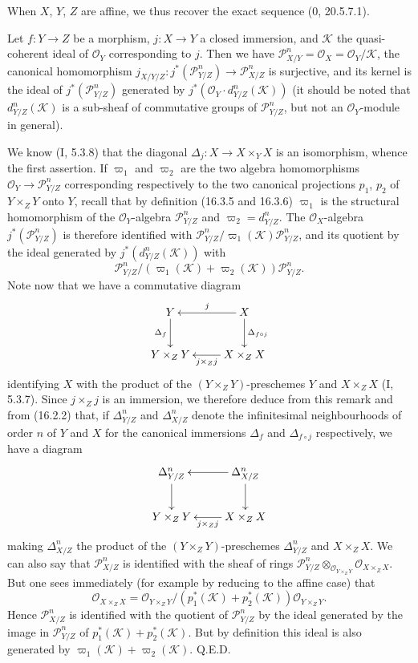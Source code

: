 When $X$, $Y$, $Z$ are affine, we thus recover the exact sequence
(0, 20.5.7.1).

\begin{proposition}[16.4.20]
\label{IV.16.4.20}
Let $f:Y\to Z$ be a morphism, $j:X\to Y$ a closed immersion, and
$\mathscr{K}$ the quasi-coherent ideal of $\mathcal{O}_Y$ corresponding to $j$.
Then we have
$\mathscr{P}_{X/Y}^n=\mathcal{O}_X=\mathcal{O}_Y/\mathscr{K}$,
the canonical homomorphism
$j_{X/Y/Z}:j^*(\mathscr{P}_{Y/Z}^n)\to\mathscr{P}_{X/Z}^n$ is surjective, and
its kernel is the ideal of $j^*(\mathscr{P}_{Y/Z}^n)$ generated by
$j^*(\mathcal{O}_Y\cdot d_{Y/Z}^n(\mathscr{K}))$ (it should be noted that
$d_{Y/Z}^n(\mathscr{K})$ is a sub-sheaf of commutative groups of
$\mathscr{P}_{Y/Z}^n$, but not an $\mathcal{O}_Y$-module in general).
\end{proposition}

We know (I, 5.3.8) that the diagonal
$\Delta_j:X\to X\times_Y X$ is an isomorphism, whence the first assertion.
If $\varpi_1$ and $\varpi_2$ are the two algebra homomorphisms
$\mathcal{O}_Y\to\mathscr{P}_{Y/Z}^n$ corresponding respectively to the two
canonical projections $p_1$, $p_2$ of $Y\times_Z Y$ onto $Y$, recall that
by definition (16.3.5 and 16.3.6) $\varpi_1$ is the structural homomorphism of
the $\mathcal{O}_Y$-algebra $\mathscr{P}_{Y/Z}^n$ and
$\varpi_2=d_{Y/Z}^n$. The $\mathcal{O}_X$-algebra
$j^*(\mathscr{P}_{Y/Z}^n)$ is therefore identified with
$\mathscr{P}_{Y/Z}^n/\varpi_1(\mathscr{K})\mathscr{P}_{Y/Z}^n$, and its quotient
by the ideal generated by $j^*(d_{Y/Z}^n(\mathscr{K}))$ with
\[
  \mathscr{P}_{Y/Z}^n/
  (\varpi_1(\mathscr{K})+\varpi_2(\mathscr{K}))\mathscr{P}_{Y/Z}^n.
\]
Note now that we have a commutative diagram
\[
  \xymatrix{
    Y\ar[d]_-{\Delta_f}&X\ar[l]_-j\ar[d]^-{\Delta_{f\circ j}}\\
    Y\times_Z Y&X\times_Z X\ar[l]^-{j\times_Z j}
  }
\]
identifying $X$ with the product of the $(Y\times_Z Y)$-preschemes $Y$ and
$X\times_Z X$ (I, 5.3.7). Since $j\times_Z j$ is an immersion, we therefore
deduce from this remark and from (16.2.2) that, if $\Delta_{Y/Z}^n$ and
$\Delta_{X/Z}^n$ denote the infinitesimal neighbourhoods of order $n$ of $Y$
and $X$ for the canonical immersions $\Delta_f$ and $\Delta_{f\circ j}$
respectively, we have a diagram
\[
  \xymatrix{
    \Delta_{Y/Z}^n\ar[d]&\Delta_{X/Z}^n\ar[l]\ar[d]\\
    Y\times_Z Y&X\times_Z X\ar[l]^-{j\times_Z j}
  }
\]
making $\Delta_{X/Z}^n$ the product of the $(Y\times_Z Y)$-preschemes
$\Delta_{Y/Z}^n$ and $X\times_Z X$. We can also say that
$\mathscr{P}_{X/Z}^n$ is identified with the sheaf of rings
$\mathscr{P}_{Y/Z}^n\otimes_{\mathcal{O}_{Y\times_Z Y}}
\mathcal{O}_{X\times_Z X}$. But one sees immediately (for example by reducing
to the affine case) that
\[
  \mathcal{O}_{X\times_Z X}=
  \mathcal{O}_{Y\times_Z Y}/
  (p_1^*(\mathscr{K})+p_2^*(\mathscr{K}))
  \mathcal{O}_{Y\times_Z Y}.
\]
Hence $\mathscr{P}_{X/Z}^n$ is identified with the quotient of
$\mathscr{P}_{Y/Z}^n$ by the ideal generated by the image in
$\mathscr{P}_{Y/Z}^n$ of $p_1^*(\mathscr{K})+p_2^*(\mathscr{K})$. But by
definition this ideal is also generated by
$\varpi_1(\mathscr{K})+\varpi_2(\mathscr{K})$. Q.E.D.

